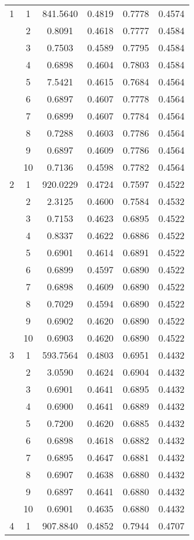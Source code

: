 \begin{longtable}{|c|c|c|c|c|c|}
1 & 1 & 841.5640 & 0.4819 & 0.7778 & 0.4574 \\
& 2 & 0.8091 & 0.4618 & 0.7777 & 0.4584 \\
& 3 & 0.7503 & 0.4589 & 0.7795 & 0.4584 \\
& 4 & 0.6898 & 0.4604 & 0.7803 & 0.4584 \\
& 5 & 7.5421 & 0.4615 & 0.7684 & 0.4564 \\
& 6 & 0.6897 & 0.4607 & 0.7778 & 0.4564 \\
& 7 & 0.6899 & 0.4607 & 0.7784 & 0.4564 \\
& 8 & 0.7288 & 0.4603 & 0.7786 & 0.4564 \\
& 9 & 0.6897 & 0.4609 & 0.7786 & 0.4564 \\
& 10 & 0.7136 & 0.4598 & 0.7782 & 0.4564 \\
\hline
2 & 1 & 920.0229 & 0.4724 & 0.7597 & 0.4522 \\
& 2 & 2.3125 & 0.4600 & 0.7584 & 0.4532 \\
& 3 & 0.7153 & 0.4623 & 0.6895 & 0.4522 \\
& 4 & 0.8337 & 0.4622 & 0.6886 & 0.4522 \\
& 5 & 0.6901 & 0.4614 & 0.6891 & 0.4522 \\
& 6 & 0.6899 & 0.4597 & 0.6890 & 0.4522 \\
& 7 & 0.6898 & 0.4609 & 0.6890 & 0.4522 \\
& 8 & 0.7029 & 0.4594 & 0.6890 & 0.4522 \\
& 9 & 0.6902 & 0.4620 & 0.6890 & 0.4522 \\
& 10 & 0.6903 & 0.4620 & 0.6890 & 0.4522 \\
\hline
3 & 1 & 593.7564 & 0.4803 & 0.6951 & 0.4432 \\
& 2 & 3.0590 & 0.4624 & 0.6904 & 0.4432 \\
& 3 & 0.6901 & 0.4641 & 0.6895 & 0.4432 \\
& 4 & 0.6900 & 0.4641 & 0.6889 & 0.4432 \\
& 5 & 0.7200 & 0.4620 & 0.6885 & 0.4432 \\
& 6 & 0.6898 & 0.4618 & 0.6882 & 0.4432 \\
& 7 & 0.6895 & 0.4647 & 0.6881 & 0.4432 \\
& 8 & 0.6907 & 0.4638 & 0.6880 & 0.4432 \\
& 9 & 0.6897 & 0.4641 & 0.6880 & 0.4432 \\
& 10 & 0.6901 & 0.4635 & 0.6880 & 0.4432 \\
\hline
4 & 1 & 907.8840 & 0.4852 & 0.7944 & 0.4707 \\

\end{longtable}
